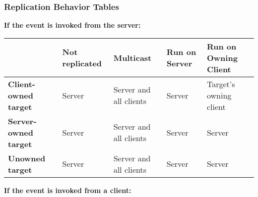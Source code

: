 \documentclass[
  letterpaper,
  DIV=11,
  numbers=noendperiod]{scrartcl}
\begin{document}
\subsubsection{Replication Behavior
Tables}\label{replication-behavior-tables}

\textbf{If the event is invoked from the server:}

\begin{longtable}[]{@{}
  >{\raggedright\arraybackslash}p{}
  >{\raggedright\arraybackslash}p{}
  >{\raggedright\arraybackslash}p{}
  >{\raggedright\arraybackslash}p{}
  >{\raggedright\arraybackslash}p{}@{}}
\toprule\noalign{}
\begin{minipage}[b]{\linewidth}\raggedright
\end{minipage} & \begin{minipage}[b]{\linewidth}\raggedright
Not replicated
\end{minipage} & \begin{minipage}[b]{\linewidth}\raggedright
Multicast
\end{minipage} & \begin{minipage}[b]{\linewidth}\raggedright
Run on Server
\end{minipage} & \begin{minipage}[b]{\linewidth}\raggedright
Run on Owning Client
\end{minipage} \\
\midrule\noalign{}
\endhead
\bottomrule\noalign{}
\endlastfoot
\textbf{Client-owned target} & Server & Server and all clients & Server
& Target's owning client \\
\textbf{Server-owned target} & Server & Server and all clients & Server
& Server \\
\textbf{Unowned target} & Server & Server and all clients & Server &
Server \\
\end{longtable}

\textbf{If the event is invoked from a client:}
\end{document}
